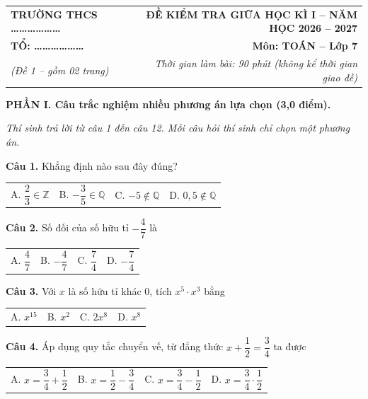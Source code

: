 \documentclass[10.5pt,a4paper]{article}
\begin{document}
\noindent
\begin{tabularx}{\linewidth}{X r}
\textbf{TRƯỜNG THCS \dots\dots\dots\dots\dots\dots} & \textbf{ĐỀ KIỂM TRA GIỮA HỌC KÌ I -- NĂM HỌC 2026 -- 2027} \\
\textbf{TỔ: \dots\dots\dots\dots\dots\dots} & \textbf{Môn: TOÁN -- Lớp 7} \\
\textit{(Đề 1 -- gồm 02 trang)} & \textit{Thời gian làm bài: 90 phút (không kể thời gian giao đề)} \\
\end{tabularx}

\vspace{1mm}
\noindent
{}

\vspace{1.5mm}
\noindent\textbf{\large PHẦN I. Câu trắc nghiệm nhiều phương án lựa chọn (3,0 điểm).}
\vspace{0.5mm}

\noindent\textit{Thí sinh trả lời từ câu 1 đến câu 12. Mỗi câu hỏi thí sinh chỉ chọn một phương án.}

\vspace{1mm}
\noindent\textbf{Câu 1.} Khẳng định nào sau đây đúng?\\
\begin{tabularx}{\linewidth}{X X X X}
A. $\dfrac{2}{3} \in \mathbb{Z}$ & B. $-\dfrac{3}{5} \in \mathbb{Q}$ & C. $-5 \notin \mathbb{Q}$ & D. $0,5 \notin \mathbb{Q}$
\end{tabularx}

\vspace{1mm}
\noindent\textbf{Câu 2.} Số đối của số hữu tỉ $-\dfrac{4}{7}$ là\\
\begin{tabularx}{\linewidth}{X X X X}
A. $\dfrac{4}{7}$ & B. $-\dfrac{4}{7}$ & C. $\dfrac{7}{4}$ & D. $-\dfrac{7}{4}$
\end{tabularx}

\vspace{1mm}
\noindent\textbf{Câu 3.} Với $x$ là số hữu tỉ khác 0, tích $x^5 \cdot x^3$ bằng\\
\begin{tabularx}{\linewidth}{X X X X}
A. $x^{15}$ & B. $x^2$ & C. $2x^8$ & D. $x^8$
\end{tabularx}

\vspace{1mm}
\noindent\textbf{Câu 4.} Áp dụng quy tắc chuyển vế, từ đẳng thức $x + \dfrac{1}{2} = \dfrac{3}{4}$ ta được\\
\begin{tabularx}{\linewidth}{X X X X}
A. $x = \dfrac{3}{4} + \dfrac{1}{2}$ & B. $x = \dfrac{1}{2} - \dfrac{3}{4}$ & C. $x = \dfrac{3}{4} - \dfrac{1}{2}$ & D. $x = \dfrac{3}{4} \cdot \dfrac{1}{2}$
\end{tabularx}
\end{document}
